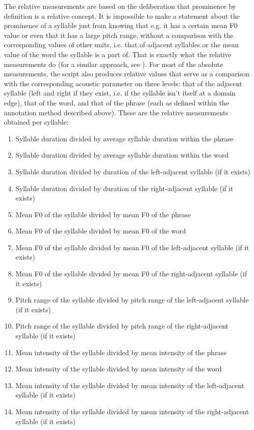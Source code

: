 \documentclass[output=paper]{LSP/langsci}
\begin{document}
The relative measurements are based on the deliberation that prominence by definition is a relative concept. It is impossible to make a statement about the prominence of a syllable just from knowing that e.g. it has a certain mean F0 value or even that it has a large pitch range, without a comparison with the corresponding values of other units, i.e. that of adjacent syllables or the mean value of the word the syllable is a part of. That is exactly what the relative measurements do (for a similar approach, see \citealt{PamiesBertran1996}). For most of the absolute measurements, the script also produces relative values that serve as a comparison with the corresponding acoustic parameter on three levels: that of the adjacent syllable (left and right if they exist, i.e. if the syllable isn’t itself at a domain edge), that of the word, and that of the phrase (each as defined within the annotation method described above). These are the relative measurements obtained per syllable:

\begin{enumerate}
\item  Syllable duration divided by average syllable duration within the phrase
\item  Syllable duration divided by average syllable duration within the word
\item  Syllable duration divided by duration of the left-adjacent syllable (if it exists)
\item  Syllable duration divided by duration of the right-adjacent syllable (if it exists)
\item  Mean F0 of the syllable divided by mean F0 of the phrase
\item  Mean F0 of the syllable divided by mean F0 of the word
\item  Mean F0 of the syllable divided by mean F0 of the left-adjacent syllable (if it exists)
\item  Mean F0 of the syllable divided by mean F0 of the right-adjacent syllable (if it exists)
\item  Pitch range of the syllable divided by pitch range of the left-adjacent syllable (if it exists)
\item  Pitch range of the syllable divided by pitch range of the right-adjacent syllable (if it exists)
\item  Mean intensity of the syllable divided by mean intensity of the phrase
\item  Mean intensity of the syllable divided by mean intensity of the word
\item  Mean intensity of the syllable divided by mean intensity of the left-adjacent syllable (if it exists)
\item  Mean intensity of the syllable divided by mean intensity of the right-ad\-ja\-cent syllable (if it exists)
\end{enumerate}
\end{document}
